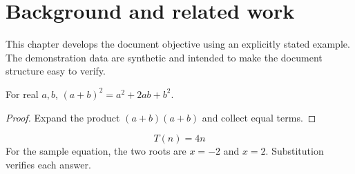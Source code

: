 \chapter{Background and related work}


\label{sec:chapter2}
This chapter develops the document objective using an explicitly stated example. The demonstration data are synthetic and intended to make the document structure easy to verify.

\begin{demotheorem}
For real $a,b$, $(a+b)^2=a^2+2ab+b^2$.
\end{demotheorem}
\begin{proof}
Expand the product $(a+b)(a+b)$ and collect equal terms.
\end{proof}
\[T(n)=4n\]
For the sample equation, the two roots are $x=-2$ and $x=2$. Substitution verifies each answer.
